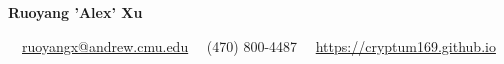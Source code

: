 \begin{center}
	{\LARGE \textbf{Ruoyang 'Alex' Xu}}
	\\
	\vspace{1.3mm}

	\ \  \href{mailto:ruoyangx@andrew.cmu.edu}{ruoyangx@andrew.cmu.edu} \ \textbullet  \ (470) 800-4487 \ \textbullet \ \url{https://cryptum169.github.io}

\end{center}
